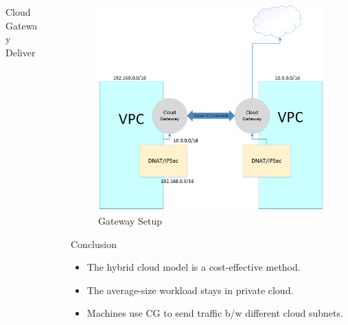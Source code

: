\documentclass[final]{beamer}
\newlength{\sepwid}
\newlength{\onecolwid}
\newlength{\twocolwid}
\begin{document}
\begin{frame}[t]
\begin{columns}[t]
\begin{column}{\twocolwid}
\begin{columns}[t,totalwidth=\twocolwid]
\begin{column}{\onecolwid}
\begin{block}{Cloud Gateway Deliver}
\end{block}



\end{column} %

\end{columns} %

\end{column} %

\begin{column}{\sepwid}\end{column} %

\begin{column}{\onecolwid} %




\begin{figure}
\includegraphics[width=0.8\linewidth]{Gatewayr.png}
\caption{Gateway Setup}
\end{figure}


\begin{block}{Conclusion}

\begin{itemize}
\item The hybrid cloud model is a cost-effective method.
\item The average-size workload stays in private cloud.
\item Machines use CG to send traffic b/w different cloud subnets.
\end{itemize}


\end{block}
\end{column}
\end{columns}
\end{frame}
\end{document}
